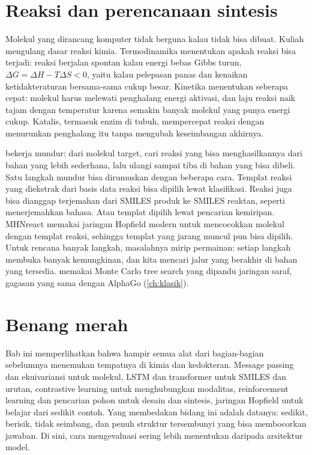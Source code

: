 \section{Reaksi dan perencanaan sintesis}

Molekul yang dirancang komputer tidak berguna kalau tidak bisa dibuat. Kuliah mengulang dasar reaksi kimia. Termodinamika
menentukan apakah reaksi bisa terjadi: reaksi berjalan spontan kalau energi bebas Gibbs turun,
$\Delta G=\Delta H-T\Delta S<0$, yaitu kalau pelepasan panas dan kenaikan ketidakteraturan bersama-sama cukup besar.
Kinetika menentukan seberapa cepat: molekul harus melewati penghalang energi aktivasi, dan laju reaksi naik tajam dengan
temperatur karena semakin banyak molekul yang punya energi cukup. Katalis, termasuk enzim di tubuh, mempercepat reaksi dengan
menurunkan penghalang itu tanpa mengubah keseimbangan akhirnya.

 bekerja mundur: dari molekul target, cari reaksi yang bisa menghasilkannya dari bahan yang lebih
sederhana, lalu ulangi sampai tiba di bahan yang bisa dibeli. Satu langkah mundur bisa dirumuskan dengan beberapa cara.
Templat reaksi yang diekstrak dari basis data reaksi bisa dipilih lewat klasifikasi. Reaksi juga bisa dianggap terjemahan
dari SMILES produk ke SMILES reaktan, seperti menerjemahkan bahasa. Atau templat dipilih lewat pencarian kemiripan.
MHNreact \citep{seidl2022} memakai jaringan Hopfield modern untuk mencocokkan molekul dengan templat reaksi, sehingga templat
yang jarang muncul pun bisa dipilih. Untuk rencana banyak langkah, masalahnya mirip permainan: setiap langkah membuka banyak
kemungkinan, dan kita mencari jalur yang berakhir di bahan yang tersedia. \citet{segler2018} memakai Monte Carlo tree search
yang dipandu jaringan saraf, gagasan yang sama dengan AlphaGo (\cref{ch:klasik}).

\section{Benang merah}

Bab ini memperlihatkan bahwa hampir semua alat dari bagian-bagian sebelumnya menemukan tempatnya di kimia dan kedokteran.
Message passing dan ekuivariansi untuk molekul, LSTM dan transformer untuk SMILES dan urutan, contrastive learning untuk
menghubungkan modalitas, reinforcement learning dan pencarian pohon untuk desain dan sintesis, jaringan Hopfield untuk
belajar dari sedikit contoh. Yang membedakan bidang ini adalah datanya: sedikit, berisik, tidak seimbang, dan penuh
struktur tersembunyi yang bisa membocorkan jawaban. Di sini, cara mengevaluasi sering lebih menentukan daripada arsitektur
model.

